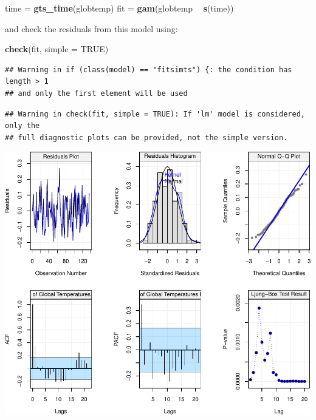 \documentclass[]{book}
\newenvironment{Shaded}{\begin{snugshade}}{\end{snugshade}}
\newcommand{\KeywordTok}[1]{\textcolor[rgb]{0.13,0.29,0.53}{\textbf{#1}}}
\newcommand{\DataTypeTok}[1]{\textcolor[rgb]{0.13,0.29,0.53}{#1}}
\newcommand{\StringTok}[1]{\textcolor[rgb]{0.31,0.60,0.02}{#1}}
\newcommand{\OtherTok}[1]{\textcolor[rgb]{0.56,0.35,0.01}{#1}}
\newcommand{\OperatorTok}[1]{\textcolor[rgb]{0.81,0.36,0.00}{\textbf{#1}}}
\newcommand{\NormalTok}[1]{#1}
\theoremstyle{definition}
\theoremstyle{definition}
\theoremstyle{definition}
\theoremstyle{remark}
\begin{document}
\begin{Shaded}
\begin{Highlighting}[]
\NormalTok{time =}\StringTok{ }\KeywordTok{gts_time}\NormalTok{(globtemp)}
\NormalTok{fit =}\StringTok{ }\KeywordTok{gam}\NormalTok{(globtemp }\OperatorTok{~}\StringTok{ }\KeywordTok{s}\NormalTok{(time))}
\end{Highlighting}
\end{Shaded}

and check the residuals from this model using:

\begin{Shaded}
\begin{Highlighting}[]
\KeywordTok{check}\NormalTok{(fit, }\DataTypeTok{simple =} \OtherTok{TRUE}\NormalTok{)}
\end{Highlighting}
\end{Shaded}

\begin{verbatim}
## Warning in if (class(model) == "fitsimts") {: the condition has length > 1
## and only the first element will be used
\end{verbatim}

\begin{verbatim}
## Warning in check(fit, simple = TRUE): If 'lm' model is considered, only the
## full diagnostic plots can be provided, not the simple version.
\end{verbatim}

\begin{center}\includegraphics{ts_files/figure-latex/gamresid-1} \end{center}
\end{document}
